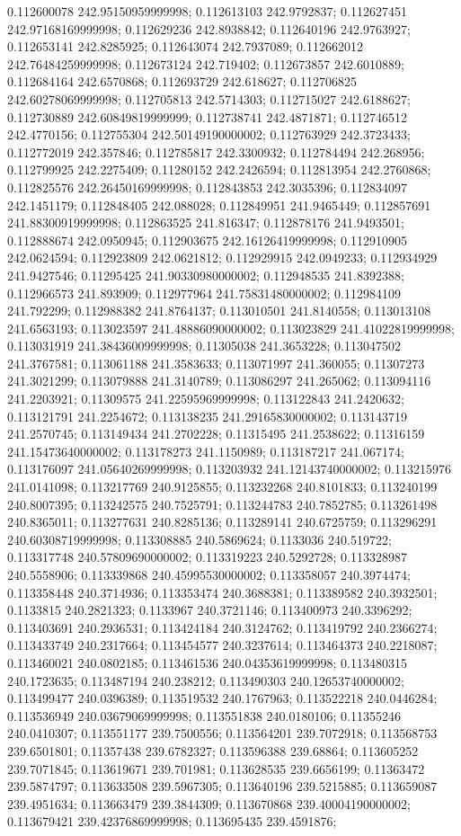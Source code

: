 0.112600078 242.95150959999998; 0.112613103 242.9792837; 0.112627451 242.97168169999998; 0.112629236 242.8938842; 0.112640196 242.9763927; 0.112653141 242.8285925; 0.112643074 242.7937089; 0.112662012 242.76484259999998; 0.112673124 242.719402; 0.112673857 242.6010889; 0.112684164 242.6570868; 0.112693729 242.618627; 0.112706825 242.60278069999998; 0.112705813 242.5714303; 0.112715027 242.6188627; 0.112730889 242.60849819999999; 0.112738741 242.4871871; 0.112746512 242.4770156; 0.112755304 242.50149190000002; 0.112763929 242.3723433; 0.112772019 242.357846; 0.112785817 242.3300932; 0.112784494 242.268956; 0.112799925 242.2275409; 0.11280152 242.2426594; 0.112813954 242.2760868; 0.112825576 242.26450169999998; 0.112843853 242.3035396; 0.112834097 242.1451179; 0.112848405 242.088028; 0.112849951 241.9465449; 0.112857691 241.88300919999998; 0.112863525 241.816347; 0.112878176 241.9493501; 0.112888674 242.0950945; 0.112903675 242.16126419999998; 0.112910905 242.0624594; 0.112923809 242.0621812; 0.112929915 242.0949233; 0.112934929 241.9427546; 0.11295425 241.90330980000002; 0.112948535 241.8392388; 0.112966573 241.893909; 0.112977964 241.75831480000002; 0.112984109 241.792299; 0.112988382 241.8764137; 0.113010501 241.8140558; 0.113013108 241.6563193; 0.113023597 241.48886090000002; 0.113023829 241.41022819999998; 0.113031919 241.38436009999998; 0.11305038 241.3653228; 0.113047502 241.3767581; 0.113061188 241.3583633; 0.113071997 241.360055; 0.11307273 241.3021299; 0.113079888 241.3140789; 0.113086297 241.265062; 0.113094116 241.2203921; 0.11309575 241.22595969999998; 0.113122843 241.2420632; 0.113121791 241.2254672; 0.113138235 241.29165830000002; 0.113143719 241.2570745; 0.113149434 241.2702228; 0.11315495 241.2538622; 0.11316159 241.15473640000002; 0.113178273 241.1150989; 0.113187217 241.067174; 0.113176097 241.05640269999998; 0.113203932 241.12143740000002; 0.113215976 241.0141098; 0.113217769 240.9125855; 0.113232268 240.8101833; 0.113240199 240.8007395; 0.113242575 240.7525791; 0.113244783 240.7852785; 0.113261498 240.8365011; 0.113277631 240.8285136; 0.113289141 240.6725759; 0.113296291 240.60308719999998; 0.113308885 240.5869624; 0.1133036 240.519722; 0.113317748 240.57809690000002; 0.113319223 240.5292728; 0.113328987 240.5558906; 0.113339868 240.45995530000002; 0.113358057 240.3974474; 0.113358448 240.3714936; 0.113353474 240.3688381; 0.113389582 240.3932501; 0.1133815 240.2821323; 0.1133967 240.3721146; 0.113400973 240.3396292; 0.113403691 240.2936531; 0.113424184 240.3124762; 0.113419792 240.2366274; 0.113433749 240.2317664; 0.113454577 240.3237614; 0.113464373 240.2218087; 0.113460021 240.0802185; 0.113461536 240.04353619999998; 0.113480315 240.1723635; 0.113487194 240.238212; 0.113490303 240.12653740000002; 0.113499477 240.0396389; 0.113519532 240.1767963; 0.113522218 240.0446284; 0.113536949 240.03679069999998; 0.113551838 240.0180106; 0.11355246 240.0410307; 0.113551177 239.7500556; 0.113564201 239.7072918; 0.113568753 239.6501801; 0.11357438 239.6782327; 0.113596388 239.68864; 0.113605252 239.7071845; 0.113619671 239.701981; 0.113628535 239.6656199; 0.11363472 239.5874797; 0.113633508 239.5967305; 0.113640196 239.5215885; 0.113659087 239.4951634; 0.113663479 239.3844309; 0.113670868 239.40004190000002; 0.113679421 239.42376869999998; 0.113695435 239.4591876; 